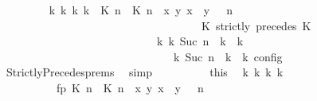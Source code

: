 \begin{isabellebody}
\ \ \ \ \ \ \ \ \isamarkupfalse%
\ {\isacartoucheopen}{\isasymexists}{\isasymGamma}\isactrlsub k\ {\isasymPsi}\isactrlsub k\ {\isasymPhi}\isactrlsub k\ k{\isachardot}\ {\isacharparenleft}{\isacharparenleft}{\isacharparenleft}{\isacharparenleft}{\isasymlceil}{\isacharhash}\isactrlsup {\isasymle}\ K\ n{\isacharcomma}\ {\isacharhash}\isactrlsup {\isacharless}\ K\ n{\isasymrceil}\ {\isasymin}\ {\isacharparenleft}{\isasymlambda}{\isacharparenleft}x{\isacharcomma}\ y{\isacharparenright}{\isachardot}\ x\ {\isasymle}\ y{\isacharparenright}{\isacharparenright}\ {\isacharhash}\ {\isasymGamma}{\isacharparenright}{\isacharcomma}\ n\isanewline
\ \ \ \ \ \ \ \ \ \ \ \ \ \ \ \ \ \ \ \ \ \ \ \ \ \ \ \ \ \ \ \ \ \ {\isasymturnstile}\ {\isasymPsi}\ {\isasymtriangleright}\ {\isacharparenleft}{\isacharparenleft}K\ strictly\ precedes\ K\ {\isacharhash}\ {\isasymPhi}{\isacharparenright}{\isacharparenright}\isanewline
\ \ \ \ \ \ \ \ \ \ \ \ \ \ \ \ \ \ \ \ \ \ \ \ \ \ \ \ \ {\isasymhookrightarrow}\isactrlbsup k\isactrlesup \ {\isacharparenleft}{\isasymGamma}\isactrlsub k{\isacharcomma}\ Suc\ n\ {\isasymturnstile}\ {\isasymPsi}\isactrlsub k\ {\isasymtriangleright}\ {\isasymPhi}\isactrlsub k{\isacharparenright}{\isacharparenright}\isanewline
\ \ \ \ \ \ \ \ \ \ \ \ \ \ \ \ \ \ \ \ \ \ \ \ \ \ \ \ {\isasymand}\ {\isacharparenleft}{\isasymrho}\ {\isasymin}\ {\isasymlbrakk}\ {\isasymGamma}\isactrlsub k{\isacharcomma}\ Suc\ n\ {\isasymturnstile}\ {\isasymPsi}\isactrlsub k\ {\isasymtriangleright}\ {\isasymPhi}\isactrlsub k\ {\isasymrbrakk}\isactrlsub c\isactrlsub o\isactrlsub n\isactrlsub f\isactrlsub i\isactrlsub g{\isacharparenright}{\isacartoucheclose}\isanewline
\ \ \ \ \ \ \ \ \ \ \isamarkupfalse%
\ \ StrictlyPrecedes{\isachardot}prems\ \isamarkupfalse%
\ simp\isanewline
\ \ \ \ \ \ \ \ \isamarkupfalse%
\ this\ \isamarkupfalse%
\ {\isasymGamma}\isactrlsub k\ {\isasymPsi}\isactrlsub k\ {\isasymPhi}\isactrlsub k\ k\isanewline
\ \ \ \ \ \ \ \ \ \ \ fp{\isacharcolon}{\isacartoucheopen}{\isacharparenleft}{\isacharparenleft}{\isacharparenleft}{\isasymlceil}{\isacharhash}\isactrlsup {\isasymle}\ K\ n{\isacharcomma}\ {\isacharhash}\isactrlsup {\isacharless}\ K\ n{\isasymrceil}\ {\isasymin}\ {\isacharparenleft}{\isasymlambda}{\isacharparenleft}x{\isacharcomma}\ y{\isacharparenright}{\isachardot}\ x\ {\isasymle}\ y{\isacharparenright}{\isacharparenright}\ {\isacharhash}\ {\isasymGamma}{\isacharparenright}{\isacharcomma}\ n\isanewline

\end{isabellebody}
